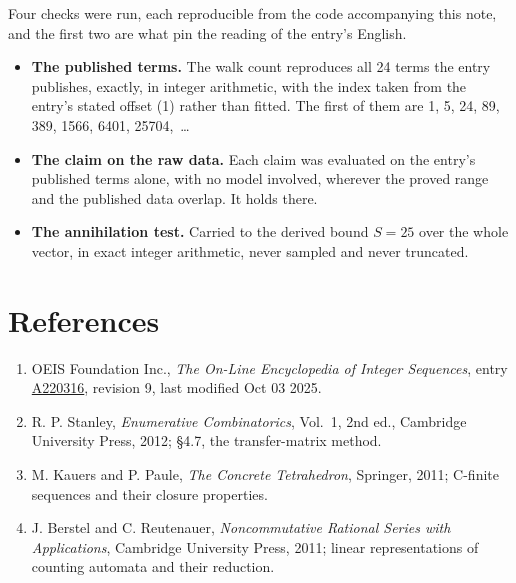\documentclass[11pt]{article}
\theoremstyle{definition}
\begin{document}
Four checks were run, each reproducible from the code accompanying this note, and the first two are what pin the reading of the entry's English.

\begin{itemize}

\item {\bfseries The published terms.} The walk count reproduces all 24 terms the entry publishes, exactly, in integer arithmetic, with the index taken from the entry's stated offset (1) rather than fitted. The first of them are 1, 5, 24, 89, 389, 1566, 6401, 25704,~\dots

\item {\bfseries The claim on the raw data.} Each claim was evaluated on the entry's published terms alone, with no model involved, wherever the proved range and the published data overlap. It holds there.

\item {\bfseries The annihilation test.} Carried to the derived bound $S = 25$ over the whole vector, in exact integer arithmetic, never sampled and never truncated.

\end{itemize}

\section{References}

\begin{enumerate}

\item OEIS Foundation Inc., \emph{The On-Line Encyclopedia of Integer Sequences}, entry \href{https://oeis.org/A220316}{A220316}, revision 9, last modified Oct 03 2025.

\item R. P. Stanley, \emph{Enumerative Combinatorics}, Vol.~1, 2nd ed., Cambridge University Press, 2012; \S4.7, the transfer-matrix method.

\item M. Kauers and P. Paule, \emph{The Concrete Tetrahedron}, Springer, 2011; C-finite sequences and their closure properties.

\item J. Berstel and C. Reutenauer, \emph{Noncommutative Rational Series with Applications}, Cambridge University Press, 2011; linear representations of counting automata and their reduction.

\end{enumerate}
\end{document}
